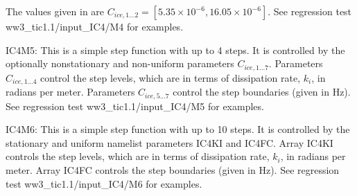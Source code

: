 The values given in \cite{art:Ko14} are ${C_{ice,1...2}}=[5.35\times 10^{-6}, 16.05\times 10^{-6}]$. See regression test {\file ww3\_tic1.1/input\_IC4/M4} for examples.

{\code IC4M5}: This is a simple step function with up to 4 steps. It is controlled by the optionally nonstationary and non-uniform parameters ${C_{ice,1...7}}$. Parameters ${C_{ice,1...4}}$ control the step levels, which are in terms of dissipation rate, ${k_i}$, in radians per meter. Parameters ${C_{ice,5...7}}$ control the step boundaries (given in Hz). See regression test {\file ww3\_tic1.1/input\_IC4/M5} for examples.

{\code IC4M6}: This is a simple step function with up to 10 steps. It is controlled by the stationary and uniform namelist parameters {\code IC4KI} and {\code IC4FC}. Array {\code IC4KI} controls the step levels, which are in terms of dissipation rate, ${k_i}$, in radians per meter. Array {\code IC4FC} controls the step boundaries (given in Hz). See regression test {\file ww3\_tic1.1/input\_IC4/M6} for examples. 
